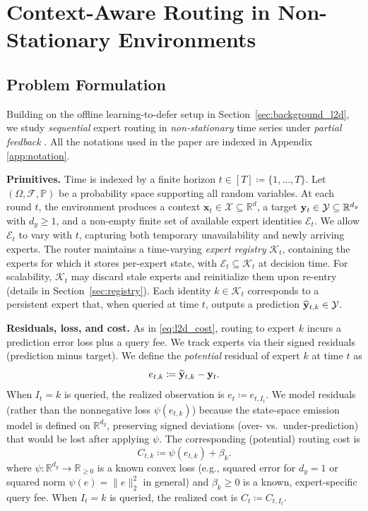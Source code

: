 \section{Context-Aware Routing in Non-Stationary Environments}

\subsection{Problem Formulation}
\label{sec:problem_formulation}

Building on the offline learning-to-defer setup in Section~\ref{sec:background_l2d}, we study
\emph{sequential} expert routing in \emph{non-stationary} time series under \emph{partial
feedback} \citep{neu2010online, dani2008stochastic}. All the notations used in the paper are indexed in Appendix \ref{app:notation}. 

\textbf{Primitives.}
Time is indexed by a finite horizon \(t\in[T]\coloneqq\{1,\dots,T\}\). Let
\((\Omega,\mathcal{F},\mathbb{P})\) be a probability space supporting all random variables. At each
round \(t\), the environment produces a context \(\mathbf{x}_t\in\mathcal{X}\subseteq\mathbb{R}^d\), a
target \(\mathbf{y}_t\in\mathcal{Y}\subseteq\mathbb{R}^{d_y}\) with \(d_y\ge 1\), and a non-empty finite set
of available expert identities \(\mathcal{E}_t\). We allow \(\mathcal{E}_t\) to vary with \(t\),
capturing both temporary unavailability and newly arriving experts.
The router maintains a time-varying \emph{expert registry} \(\mathcal{K}_t\), containing the experts
for which it stores per-expert state, with \(\mathcal{E}_t\subseteq \mathcal{K}_t\) at decision time.
For scalability, \(\mathcal{K}_t\) may discard stale experts and reinitialize them upon re-entry
(details in Section~\ref{sec:registry}).
Each identity \(k\in\mathcal{K}_t\) corresponds to a persistent expert that, when queried at time \(t\),
outputs a prediction \(\widehat{\mathbf{y}}_{t,k}\in\mathcal{Y}\).

\textbf{Residuals, loss, and cost.}
As in \eqref{eq:l2d_cost}, routing to expert \(k\) incurs a prediction error loss plus a query fee.
We track experts via their signed residuals (prediction minus target). We define the \emph{potential}
residual of expert \(k\) at time \(t\) as
\begin{equation}
\label{eq:residual}
  e_{t,k} \coloneqq \widehat{\mathbf{y}}_{t,k}-\mathbf{y}_t .
\end{equation}
When \(I_t=k\) is queried, the realized observation is \(e_t\coloneqq e_{t,I_t}\).
We model residuals (rather than the nonnegative loss \(\psi(e_{t,k})\)) because the state-space
emission model is defined on \(\mathbb{R}^{d_y}\), preserving signed deviations (over- vs.\ under-prediction)
that would be lost after applying \(\psi\).
The corresponding (potential) routing cost is
\begin{equation}
\label{eq:routing_cost}
  C_{t,k} \coloneqq \psi(e_{t,k}) + \beta_k .
\end{equation}
where \(\psi:\mathbb{R}^{d_y}\to\mathbb{R}_{\ge 0}\) is a known convex loss (e.g., squared error for
\(d_y=1\) or squared norm \(\psi(e)=\lVert e\rVert_2^2\) in general) and \(\beta_k\ge 0\) is a known,
expert-specific query fee. When \(I_t=k\) is queried, the realized cost is \(C_t\coloneqq C_{t,I_t}\).

